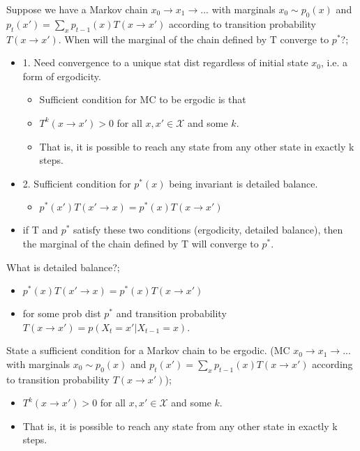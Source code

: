 \documentclass{article}
\begin{document}
Suppose we have a Markov chain $x_0 \rightarrow x_1 \rightarrow ...$ with marginals $x_0 \sim p_0(x)$ and $p_t(x') = \sum_x p_{t-1}(x)T(x\rightarrow x')$ according to transition probability $T(x\rightarrow x')$. When will the marginal of the chain defined by T converge to $p^*$?; \begin{itemize} \item 1. Need convergence to a unique stat dist regardless of initial state $x_0$, i.e. a form of ergodicity. \begin{itemize} \item Sufficient condition for MC to be ergodic is that \item $T^k(x\rightarrow x') > 0$ for all $x, x'\in \mathcal{X}$ and some $k$. \item That is, it is possible to reach any state from any other state in exactly k steps. \end{itemize} \item 2. Sufficient condition for $p^*(x)$ being invariant is detailed balance. \begin{itemize} \item $p^*(x')T(x'\rightarrow x) = p^*(x)T(x\rightarrow x')$ \end{itemize} \item if T and $p^*$ satisfy these two conditions (ergodicity, detailed balance), then the marginal of the chain defined by T will converge to $p^*$. \end{itemize}

What is detailed balance?; \begin{itemize} \item $p^*(x)T(x'\rightarrow x) = p^*(x)T(x\rightarrow x')$ \item for some prob dist $p^*$ and transition probability $T(x\rightarrow x') = p(X_t = x'|X_{t-1}=x)$. \end{itemize}

State a sufficient condition for a Markov chain to be ergodic. (MC $x_0 \rightarrow x_1 \rightarrow ...$ with marginals $x_0 \sim p_0(x)$ and $p_t(x') = \sum_x p_{t-1}(x)T(x\rightarrow x')$ according to transition probability $T(x\rightarrow x')$); \begin{itemize} \item $T^k(x\rightarrow x') > 0$ for all $x, x'\in \mathcal{X}$ and some $k$. \item That is, it is possible to reach any state from any other state in exactly k steps. \end{itemize}
    
\end{document}
